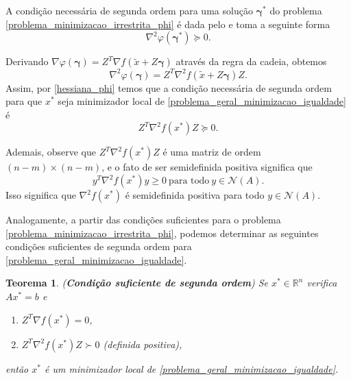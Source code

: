 \documentclass[12pt,a4paper]{scrartcl}
\def\RR{\mathds{R}}
\newtheorem{teo}{Teorema}
\theoremstyle{definition}%
\begin{document}
A condição necessária de segunda ordem para uma solução $\boldsymbol{\gamma}^{*}$ do problema \eqref{problema_minimizacao_irrestrita_phi} é dada pelo  e toma a seguinte forma
\[ \label{hessiana_phi}
\nabla^{2} \varphi (\boldsymbol{\gamma}^{*}) \succcurlyeq 0.
\]

Derivando $\nabla \varphi (\boldsymbol{\gamma}) = Z^{T}\nabla f(\tilde{x} + Z\boldsymbol{\gamma})$ através da regra da cadeia, obtemos
\[
\nabla^{2} \varphi(\boldsymbol{\gamma}) = Z^{T} \nabla^{2} f(\tilde{x} + Z\boldsymbol{\gamma})Z .
\]
Assim, por \eqref{hessiana_phi} temos que a condição necessária de segunda ordem para que $x^{*}$ seja minimizador local de \eqref{problema_geral_minimizacao_igualdade} é
\[
Z^{T} \nabla^{2} f(x^{*})Z \succcurlyeq 0.
\]

Ademais, observe que $Z^{T}\nabla^{2} f(x^{*})Z$ é uma matriz de ordem $(n-m)\times (n-m)$, e o fato de ser semidefinida positiva significa que
\[
y^{T}\nabla^{2} f(x^{*})y \geq 0 \ \text{para todo} \ y \in \mathcal{N}(A) .
\]
Isso significa que $\nabla^{2} f(x^{*})$ é semidefinida positiva para todo $y\in \mathcal{N}(A)$.

Analogamente, a partir das condições suficientes para o problema \eqref{problema_minimizacao_irrestrita_phi}, podemos determinar as seguintes condições suficientes de segunda ordem para \eqref{problema_geral_minimizacao_igualdade}.

\begin{teo}(\textbf{Condição suficiente de segunda ordem}) \label{teo:condicao_suficiente_2ordem_igualdade}
Se $x^{*} \in \RR^{n}$ verifica $Ax^{*}=b$ e 
\begin{enumerate}
	\item[(i)] $Z^{T}\nabla f(x^{*}) =0$,
	\item[(ii)] $Z^{T}\nabla^{2} f(x^{*})Z \succ 0$ (definida positiva),
\end{enumerate}	
então $x^{*}$ é um minimizador local de \eqref{problema_geral_minimizacao_igualdade}.
\end{teo}
\end{document}
